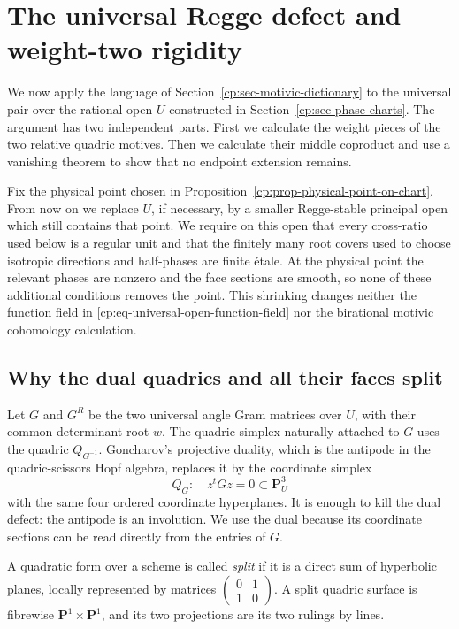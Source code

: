 \section{The universal Regge defect and weight-two rigidity}
\label{cp:sec-relative-rigidity}

We now apply the language of Section~\ref{cp:sec-motivic-dictionary} to the
universal pair over the rational open \(U\) constructed in
Section~\ref{cp:sec-phase-charts}.  The argument has two independent parts.
First we calculate the weight pieces of the two relative quadric motives.
Then we calculate their middle coproduct and use a vanishing theorem to show
that no endpoint extension remains.

Fix the physical point chosen in
Proposition~\ref{cp:prop-physical-point-on-chart}.  From now on we replace
\(U\), if necessary, by a smaller Regge-stable principal open which still
contains that point.  We require on this open that every cross-ratio used
below is a regular unit and that the finitely many root covers used to
choose isotropic directions and half-phases are finite \'etale.  At the
physical point the relevant phases are nonzero and the face sections are
smooth, so none of these additional conditions removes the point.  This
shrinking changes neither the function field in
\eqref{cp:eq-universal-open-function-field} nor the birational motivic
cohomology calculation.

\subsection{Why the dual quadrics and all their faces split}

Let \(G\) and \(G^R\) be the two universal angle Gram matrices over \(U\),
with their common determinant root \(w\).  The quadric simplex naturally
attached to \(G\) uses the quadric \(Q_{G^{-1}}\).  Goncharov's projective
duality, which is the antipode in the quadric-scissors Hopf algebra, replaces
it by the coordinate simplex
\begin{equation}
 Q_G:\quad z^tGz=0\subset\mathbf P^3_U
 \label{cp:eq-dual-quadric}
\end{equation}
with the same four ordered coordinate hyperplanes.  It is enough to kill
the dual defect: the antipode is an involution.  We use the dual because its
coordinate sections can be read directly from the entries of \(G\).

A quadratic form over a scheme is called \emph{split} if it is a direct sum
of hyperbolic planes, locally represented by matrices
\(\left(\begin{smallmatrix}0&1\\1&0\end{smallmatrix}\right)\).  A split
quadric surface is fibrewise \(\mathbf P^1\times\mathbf P^1\), and its two
projections are its two rulings by lines.


